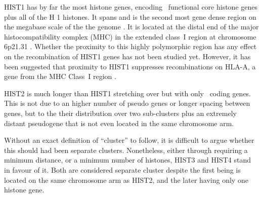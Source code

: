     HIST1 has by far the most histone genes, encoding \CodingGenesInHISTOne{}~functional
    core histone genes plus all of the H  1 histones. It spans \HISTOneSpan{}
    and is the second most gene dense region on the megabase scale of the the
    genome \citep{MHC-III-analysis}. It is located at the distal end of the major
    histocompatibility complex (MHC) in the extended class~I region at chromosome 6p21.31
    \citep{MHC-I-transcript, MHC-complete-sequencing-1999}. Whether the proximity to this
    highly polymorphic region has any effect on the recombination of HIST1 genes has not
    been studied yet. However, it has been suggested that proximity to HIST1 suppresses
    recombinations on HLA-A, a gene from the MHC Class~I region \citep{MHC-repressed-by-HIST}.


    HIST2 is much longer than HIST1 stretching over \HISTTwoSpan{} but with
    only \CodingGenesInHISTTwo{}~coding genes. This is not due to an higher
    number of pseudo genes or longer spacing between genes, but to the their
    distribution over two sub-clusters plus an extremely distant pseudogene
    that is not even located in the same chromosome arm.

    Without an exact
    definition of ``cluster'' to follow, it is difficult to argue whether this
    should had been separate clusters. Nonetheless, either through requiring
    a minimum distance, or a minimum number of histones, HIST3 and HIST4 stand in
    favour of it. Both are considered separate cluster despite
    the first being is located on the same chromosome arm as HIST2, and the
    later having only one histone gene.

